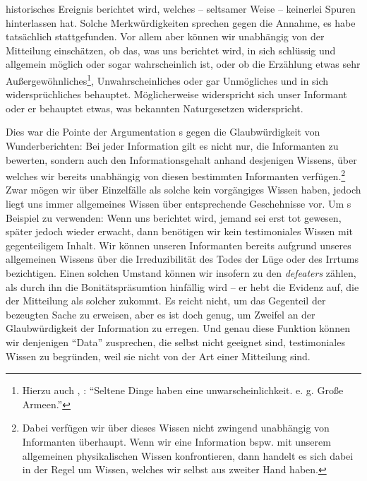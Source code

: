 historisches Ereignis berichtet wird, welches -- seltsamer Weise -- keinerlei
Spuren hinterlassen hat. Solche Merkwürdigkeiten sprechen gegen die Annahme, es
habe tatsächlich stattgefunden. Vor allem aber können wir unabhängig von der
Mitteilung einschätzen, ob das, was uns berichtet wird, in sich schlüssig und
allgemein möglich oder sogar wahrscheinlich ist, oder ob die Erzählung etwas
sehr Außergewöhnliches\footnote{Hierzu auch \cite[][]{Kant:Reflexionen1900ff.}, \cite[][XVI:
430.18]{Kant:GesammelteWerke1900ff.}:
\enquote{Seltene Dinge haben eine unwarscheinlichkeit. e. g. Große Armeen.}},
Unwahrscheinliches oder gar Unmögliches und in sich widersprüchliches behauptet.
Möglicherweise widerspricht sich unser Informant oder er behauptet etwas, was
bekannten Naturgesetzen widerspricht.

Dies war die Pointe der Argumentation s gegen die
Glaubwürdigkeit von Wunderberichten: Bei jeder Information gilt es nicht nur,
die Informanten zu bewerten, sondern auch den Informationsgehalt anhand
desjenigen Wissens, über welches wir bereits unabhängig von diesen bestimmten
Informanten verfügen.\footnote{Dabei verfügen wir über dieses Wissen nicht zwingend
unabhängig von Informanten überhaupt. Wenn wir eine Information bspw. mit
unserem allgemeinen physikalischen Wissen konfrontieren, dann handelt es sich
dabei in der Regel um Wissen, welches wir selbst aus zweiter Hand haben.} Zwar
mögen wir über Einzelfälle als solche kein vorgängiges Wissen haben, jedoch
liegt uns immer allgemeines Wissen über entsprechende Geschehnisse vor. Um
s Beispiel zu verwenden: Wenn uns berichtet wird, jemand sei
erst tot gewesen, später jedoch wieder erwacht, dann benötigen wir kein
testimoniales Wissen mit gegenteiligem Inhalt. Wir können unseren Informanten
bereits aufgrund unseres allgemeinen Wissens über die Irreduzibilität des Todes
der Lüge oder des Irrtums bezichtigen. Einen solchen
Umstand können wir insofern zu den \emph{defeaters} zählen, als durch ihn die
Bonitätspräsumtion hinfällig wird -- er hebt die Evidenz auf, die der
Mitteilung als solcher zukommt. Es reicht nicht, um das Gegenteil der bezeugten
Sache zu erweisen, aber es ist doch genug, um Zweifel an der Glaubwürdigkeit der
Information zu erregen. Und genau diese Funktion können wir denjenigen
\enquote{Data} zusprechen, die selbst nicht geeignet sind, testimoniales Wissen
zu begründen, weil sie nicht von der Art einer Mitteilung sind.

